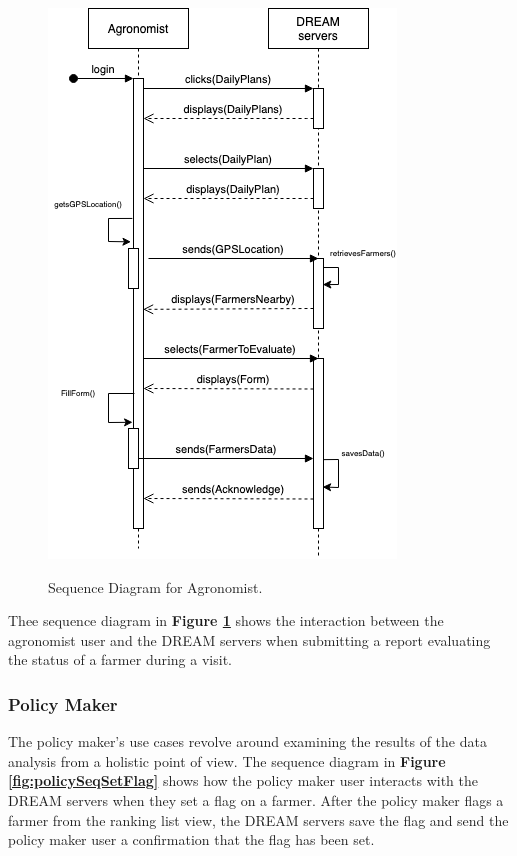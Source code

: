 \begin{figure}[hpt!]
\centering
\includegraphics[scale=0.5]{Files/sequence_disgrams/thePNGs/agronomist_sendReport.png}\\
\caption{\label{fig:agrSeqSendReport}Sequence Diagram for Agronomist.}
\end{figure}

\begin{flushleft}
Thee sequence diagram in \textbf{Figure \ref{fig:agrSeqSendReport}} shows the interaction between the agronomist user and the DREAM servers when submitting a report evaluating the status of a farmer during a visit.
\end{flushleft}


\newpage
\subsubsection{Policy Maker}


\begin{flushleft}
The policy maker's use cases revolve around examining the results of the data analysis from a holistic point of view. The sequence diagram in \textbf{Figure \ref{fig:policySeqSetFlag}} shows how the policy maker user interacts with the DREAM servers when they set a flag on a farmer. After the policy maker flags a farmer from the ranking list view, the DREAM servers save the flag and send the policy maker user a confirmation that the flag has been set.
\end{flushleft}

